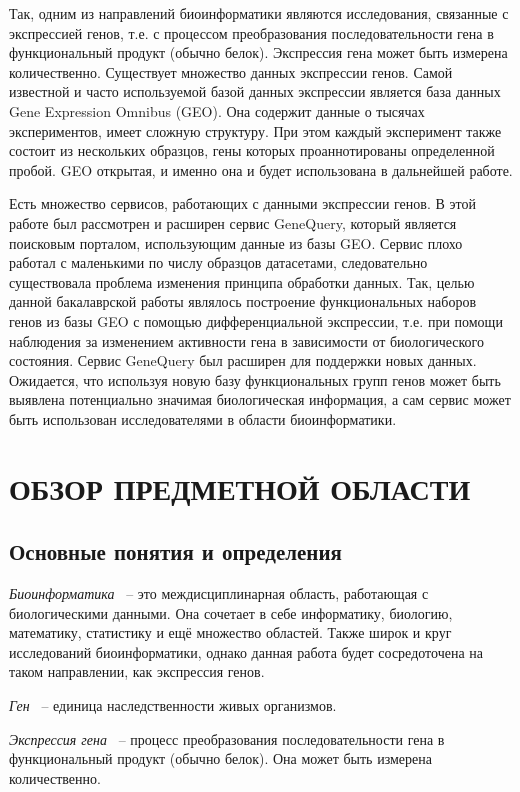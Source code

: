 \documentclass[times,specification,annotation]{itmo-student-thesis}
\begin{document}
Так, одним из направлений биоинформатики являются исследования, связанные с экспрессией генов, т.е. с процессом преобразования последовательности гена в функциональный продукт (обычно белок). Экспрессия гена может быть измерена количественно. Существует множество данных экспрессии генов. Самой известной и часто используемой базой данных экспрессии является база данных ​Gene Expression Omnibus (GEO). Она содержит данные о тысячах экспериментов, имеет сложную структуру. При этом каждый эксперимент также состоит из нескольких образцов, гены которых проаннотированы определенной пробой. GEO открытая, и именно она и будет использована в дальнейшей работе. 

Есть множество сервисов, работающих с данными экспрессии генов. В этой работе был рассмотрен и расширен сервис GeneQuery, который является поисковым порталом, использующим данные из базы GEO. Сервис плохо работал с маленькими по числу образцов датасетами, следовательно существовала проблема изменения принципа обработки данных. Так, целью данной бакалаврской работы являлось построение функциональных наборов генов из базы GEO с помощью дифференциальной экспрессии, т.е. при помощи наблюдения за изменением активности гена в зависимости от биологического состояния. Сервис GeneQuery был расширен для поддержки новых данных. Ожидается, что используя новую базу функциональных групп генов может быть выявлена потенциально значимая биологическая информация, а сам сервис может быть использован исследователями в области биоинформатики.        

\chapter{ОБЗОР ПРЕДМЕТНОЙ ОБЛАСТИ}

\section{Основные понятия и определения}
\startrelatedwork
\textit{Биоинформатика} ~-- это междисциплинарная область, работающая с биологическими данными. Она сочетает в себе информатику, биологию, математику, статистику и ещё множество областей. Также широк и круг исследований биоинформатики, однако данная работа будет сосредоточена на таком направлении, как экспрессия генов.

\textit{Ген} ~-- единица наследственности живых организмов.

\textit{Экспрессия гена} ~-- процесс преобразования последовательности гена в функциональный продукт (обычно белок). Она может быть измерена количественно. 
\end{document}
